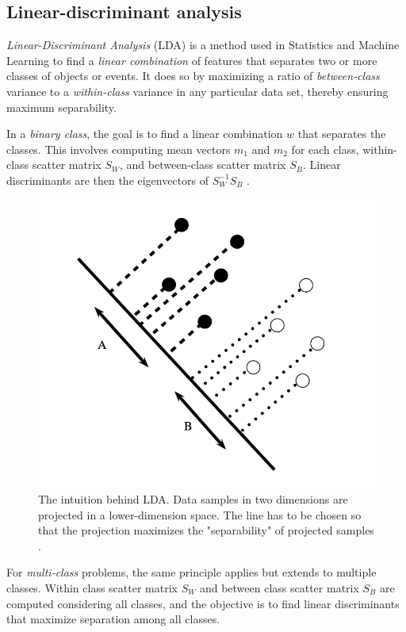         \subsection{Linear-discriminant analysis}
            \textit{Linear-Discriminant Analysis} (LDA) is a method used in Statistics and Machine Learning to find a \textit{linear combination} of features that separates two or more classes of objects or events. It does so by maximizing a ratio of \textit{between-class} variance to a \textit{within-class} variance in any particular data set, thereby ensuring maximum separability.

            In a \textit{binary class}, the goal is to find a linear combination $w$ that separates the classes. This involves computing mean vectors $m_1$ and $m_2$ for each class, within-class scatter matrix $S_W$, and between-class scatter matrix $S_B$. Linear discriminants are then the eigenvectors of $S_W^{-1}S_B$ \cite{xanthopoulos_linear_2013}. 

            \begin{figure}[H]
                \centering
                \includegraphics[width=.6\textwidth]{../src/resources/images/models/lda.png}
                \caption{
                    The intuition behind LDA. Data samples in two dimensions are projected in a lower-dimension space. The line has to be chosen so that the projection maximizes the "separability" of projected samples \cite{xanthopoulos_linear_2013}.
                }
                \label{fig:linear_discriminant_analysis}
            \end{figure}

            For \textit{multi-class} problems, the same principle applies but extends to multiple classes. Within class scatter matrix $S_W$ and between class scatter matrix $S_B$ are computed considering all classes, and the objective is to find linear discriminants that maximize separation among all classes.  

